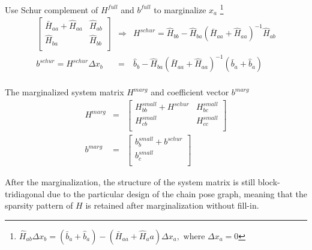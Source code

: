 \documentclass[letterpaper,10pt]{article}
\begin{document}
Use Schur complement of $H^{full}$ and $b^{full}$ to marginalize $x_a$ \footnote{$\hat{H}_{ab}\Delta x_b=(\bar{b}_a+\hat{b}_a)-(\bar{H}_{aa}+\hat{H}_aa)\Delta x_a,\text{~where~}\Delta x_a=0$}
\begin{equation}
\begin{array}{rcl}
\left[\begin{array}{cc}
\bar{H}_{aa} + \hat{H}_{aa} & \hat{H}_{ab} \\
\hat{H}_{ba} & \hat{H}_{bb} \\
\end{array}\right] & \Rightarrow & H^{schur}=\hat{H}_{bb}-\hat{H}_{ba}(\bar{H}_{aa}+\hat{H}_{aa})^{-1}\hat{H}_{ab} \\
b^{schur}=H^{schur}\Delta x_b & = & \hat{b}_b - \hat{H}_{ba}(\bar{H}_{aa}+\hat{H}_{aa})^{-1}(\bar{b}_a+\hat{b}_a) \\
\end{array}
\end{equation}

The marginalized system matrix $H^{marg}$ and coefficient vector $b^{marg}$
\begin{equation}
\begin{array}{rcl}
H^{marg} & = & \left[\begin{array}{cc}
H_{bb}^{small} + H^{schur} & H_{bc}^{small} \\
H_{cb}^{small} & H_{cc}^{small} \\
\end{array}\right] \\
b^{marg} & = & \left[\begin{array}{c}
b_b^{small} + b^{schur} \\
b_c^{small} \\
\end{array}\right]
\end{array}
\end{equation}

After the marginalization, the structure of the system matrix is still block-tridiagonal due to the particular design of the chain pose graph, meaning that the sparsity pattern of $H$ is retained after marginalization without fill-in.
\end{document}
